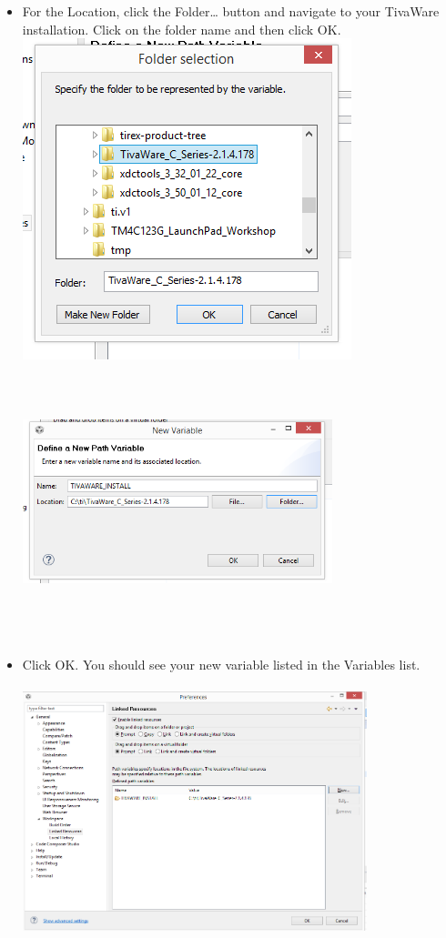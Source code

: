 \documentclass[a4paper,10pt,oneside]{article}
\begin{document}
\begin{itemize}
						\item For the Location, click
						the Folder… button and
						navigate to your TivaWare
						installation. Click on the
						folder name and then click
						OK.\\
						\includegraphics{AddVariables4}\\
						\includegraphics[width=9cm, height=8cm]{AddVariables5}
						\item Click OK. You should see your new variable listed in the Variables list.\\
						\includegraphics[width=10cm, height=8cm]{AddVariables6}
					\end{itemize}
\end{document}
